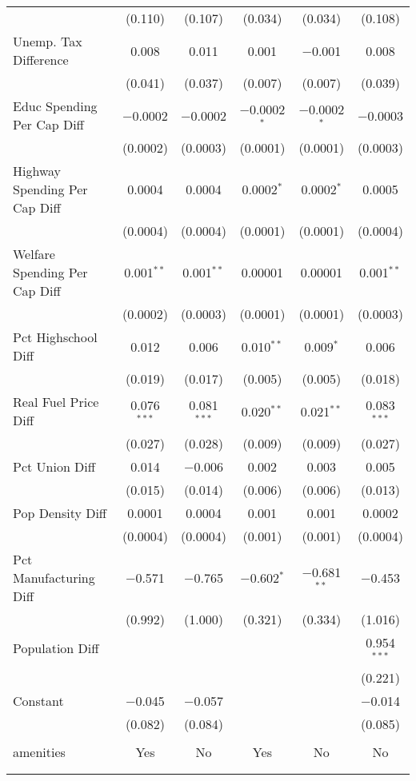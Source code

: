 \begin{table}[!htbp]
\begin{tabular}{@{\extracolsep{5pt}}lccccc}
  & (0.110) & (0.107) & (0.034) & (0.034) & (0.108) \\ 
  Unemp. Tax Difference & 0.008 & 0.011 & 0.001 & $-$0.001 & 0.008 \\ 
  & (0.041) & (0.037) & (0.007) & (0.007) & (0.039) \\ 
  Educ Spending Per Cap Diff & $-$0.0002 & $-$0.0002 & $-$0.0002$^{*}$ & $-$0.0002$^{*}$ & $-$0.0003 \\ 
  & (0.0002) & (0.0003) & (0.0001) & (0.0001) & (0.0003) \\ 
  Highway Spending Per Cap Diff & 0.0004 & 0.0004 & 0.0002$^{*}$ & 0.0002$^{*}$ & 0.0005 \\ 
  & (0.0004) & (0.0004) & (0.0001) & (0.0001) & (0.0004) \\ 
  Welfare Spending Per Cap Diff & 0.001$^{**}$ & 0.001$^{**}$ & 0.00001 & 0.00001 & 0.001$^{**}$ \\ 
  & (0.0002) & (0.0003) & (0.0001) & (0.0001) & (0.0003) \\ 
  Pct Highschool Diff & 0.012 & 0.006 & 0.010$^{**}$ & 0.009$^{*}$ & 0.006 \\ 
  & (0.019) & (0.017) & (0.005) & (0.005) & (0.018) \\ 
  Real Fuel Price Diff & 0.076$^{***}$ & 0.081$^{***}$ & 0.020$^{**}$ & 0.021$^{**}$ & 0.083$^{***}$ \\ 
  & (0.027) & (0.028) & (0.009) & (0.009) & (0.027) \\ 
  Pct Union Diff & 0.014 & $-$0.006 & 0.002 & 0.003 & 0.005 \\ 
  & (0.015) & (0.014) & (0.006) & (0.006) & (0.013) \\ 
  Pop Density Diff & 0.0001 & 0.0004 & 0.001 & 0.001 & 0.0002 \\ 
  & (0.0004) & (0.0004) & (0.001) & (0.001) & (0.0004) \\ 
  Pct Manufacturing Diff & $-$0.571 & $-$0.765 & $-$0.602$^{*}$ & $-$0.681$^{**}$ & $-$0.453 \\ 
  & (0.992) & (1.000) & (0.321) & (0.334) & (1.016) \\ 
  Population Diff &  &  &  &  & 0.954$^{***}$ \\ 
  &  &  &  &  & (0.221) \\ 
  Constant & $-$0.045 & $-$0.057 &  &  & $-$0.014 \\ 
  & (0.082) & (0.084) &  &  & (0.085) \\ 
 \hline \\[-1.8ex] 
amenities & Yes & No & Yes & No & No \\ 
\hline \\[-1.8ex] 
\hline 
\hline \\[-1.8ex] 
\end{tabular} 
\end{table} 

